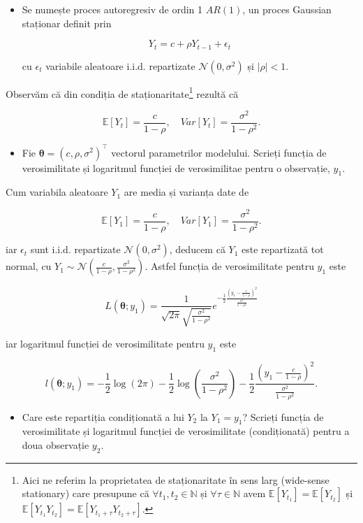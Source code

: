 \documentclass[]{article}
\let\rmarkdownfootnote\footnote%
\def\footnote{\protect\rmarkdownfootnote}
\newenvironment{frshaded*}{%
  \def\FrameCommand{\fboxrule=\FrameRule\fboxsep=\FrameSep \fcolorbox{framecolor}{shadecolor1}}%
  \MakeFramed {\advance\hsize-\width \FrameRestore}}%
{\endMakeFramed}
\newenvironment{rmdblock}[1]
  {\begin{frshaded*}
  \begin{itemize}
  \renewcommand{\labelitemi}{
    \raisebox{-.7\height}[0pt][0pt]{
      {\setkeys{Gin}{width=2em,keepaspectratio}\texttt{[image: images/icons/\#1]}}
    }
  }
  \item
  }
  {
  \end{itemize}
  \end{frshaded*}
  }
\newenvironment{rmdexercise}
  {\begin{rmdblock}{exercise}}
  {\end{rmdblock}}
\begin{document}
\begin{rmdexercise}
Se numește proces autoregresiv de ordin 1 \(AR(1)\), un proces Gaussian
staționar definit prin

\[
  Y_t = c + \rho Y_{t-1} + \epsilon_{t}
\]

cu \(\epsilon_{t}\) variabile aleatoare i.i.d. repartizate
\(\mathcal{N}(0,\sigma^2)\) și \(|\rho|<1\).
\end{rmdexercise}

Observăm că din condiția de staționaritate\footnote{Aici ne referim la
  proprietatea de staționaritate în sens larg (wide-sense stationary)
  care presupune că \(\forall t_1,t_2\in\mathbb{N}\) și
  \(\forall \tau\in\mathbb{N}\) avem
  \(\mathbb{E}[Y_{t_1}] = \mathbb{E}[Y_{t_2}]\) și
  \(\mathbb{E}[Y_{t_1}Y_{t_2}] = \mathbb{E}[Y_{t_1+\tau}Y_{t_2+\tau}]\).}
rezultă că

\[
  \mathbb{E}[Y_t] = \frac{c}{1-\rho} ,\quad Var[Y_t] = \frac{\sigma^2}{1-\rho^2}.
\]

\begin{rmdexercise}
Fie \(\boldsymbol{\theta} = (c, \rho, \sigma^2)^\intercal\) vectorul
parametrilor modelului. Scrieți funcția de verosimilitate și logaritmul
funcției de verosimilitae pentru o observație, \(y_1\).
\end{rmdexercise}

Cum variabila aleatoare \(Y_1\) are media și varianța date de

\[
  \mathbb{E}[Y_1] = \frac{c}{1-\rho} ,\quad Var[Y_1] = \frac{\sigma^2}{1-\rho^2}.
\]

iar \(\epsilon_t\) sunt i.i.d. repartizate \(\mathcal{N}(0,\sigma^2)\),
deducem că \(Y_1\) este repartizată tot normal, cu
\(Y_1\sim\mathcal{N}\left(\frac{c}{1-\rho}, \frac{\sigma^2}{1-\rho^2}\right)\).
Astfel funcția de verosimilitate pentru \(y_1\) este

\[
  L(\boldsymbol{\theta};y_1) = \frac{1}{\sqrt{2\pi}\sqrt{\frac{\sigma^2}{1-\rho^2}}}e^{-\frac{1}{2}\frac{\left(y_1 - \frac{c}{1-\rho}\right)^2}{\frac{\sigma^2}{1-\rho^2}}}
\]

iar logaritmul funcției de verosimilitate pentru \(y_1\) este

\[
  l(\boldsymbol{\theta};y_1) = -\frac{1}{2}\log(2\pi) - \frac{1}{2}\log\left(\frac{\sigma^2}{1-\rho^2}\right) -\frac{1}{2}\frac{\left(y_1 - \frac{c}{1-\rho}\right)^2}{\frac{\sigma^2}{1-\rho^2}}.
\]

\begin{rmdexercise}
Care este repartiția condiționată a lui \(Y_2\) la \(Y_1 = y_1\)?
Scrieți funcția de verosimilitate și logaritmul funcției de
verosimilitate (condiționată) pentru a doua observație \(y_2\).
\end{rmdexercise}
\end{document}
